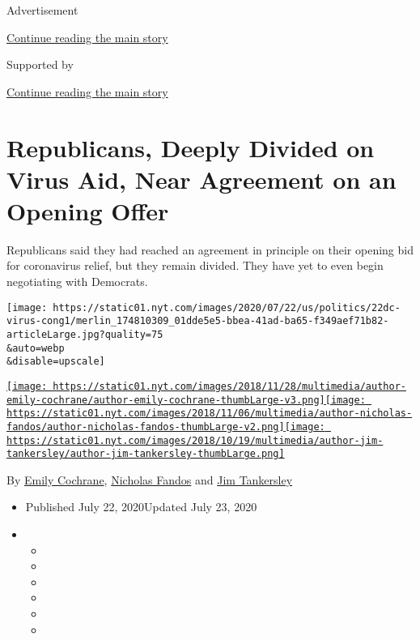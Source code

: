Advertisement

\protect\hyperlink{after-top}{Continue reading the main story}

Supported by

\protect\hyperlink{after-sponsor}{Continue reading the main story}

\hypertarget{republicans-deeply-divided-on-virus-aid-near-agreement-on-an-opening-offer}{%
\section{Republicans, Deeply Divided on Virus Aid, Near Agreement on an
Opening
Offer}\label{republicans-deeply-divided-on-virus-aid-near-agreement-on-an-opening-offer}}

Republicans said they had reached an agreement in principle on their
opening bid for coronavirus relief, but they remain divided. They have
yet to even begin negotiating with Democrats.

\texttt{[image: https://static01.nyt.com/images/2020/07/22/us/politics/22dc-virus-cong1/merlin\_174810309\_01dde5e5-bbea-41ad-ba65-f349aef71b82-articleLarge.jpg?quality=75\\\&auto=webp\\\&disable=upscale]}

\href{https://www.nytimes.com/by/emily-cochrane}{\texttt{[image: https://static01.nyt.com/images/2018/11/28/multimedia/author-emily-cochrane/author-emily-cochrane-thumbLarge-v3.png]}}\href{https://www.nytimes.com/by/nicholas-fandos}{\texttt{[image: https://static01.nyt.com/images/2018/11/06/multimedia/author-nicholas-fandos/author-nicholas-fandos-thumbLarge-v2.png]}}\href{https://www.nytimes.com/by/jim-tankersley}{\texttt{[image: https://static01.nyt.com/images/2018/10/19/multimedia/author-jim-tankersley/author-jim-tankersley-thumbLarge.png]}}

By \href{https://www.nytimes.com/by/emily-cochrane}{Emily Cochrane},
\href{https://www.nytimes.com/by/nicholas-fandos}{Nicholas Fandos} and
\href{https://www.nytimes.com/by/jim-tankersley}{Jim Tankersley}

\begin{itemize}
\item
  Published July 22, 2020Updated July 23, 2020
\item
  \begin{itemize}
  \item
  \item
  \item
  \item
  \item
  \item
  \end{itemize}
\end{itemize}

